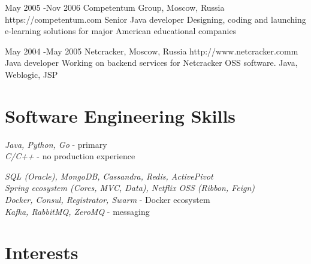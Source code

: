 \documentclass[10pt]{article} %
\begin{document}
        \job
        {May 2005 -}{Nov 2006}
        {Competentum Group, Moscow, Russia}
        {https://competentum.com}
        {Senior Java developer}
        {Designing, coding and launching e-learning solutions for major American educational companies}

        \job
        {May 2004 -}{May 2005}
        {Netcracker, Moscow, Russia}
        {http://www.netcracker.comm}
        {Java developer}
        {Working on backend services for Netcracker OSS software. Java, Weblogic, JSP}


        \section{Software Engineering Skills}

        {
            \textit{Java, Python, Go} - primary \\
            \textit{C/C++} - no production experience\\
        }


        {
            \textit{SQL (Oracle), MongoDB, Cassandra, Redis, ActivePivot}\\
            \textit{Spring ecosystem (Cores, MVC, Data), Netflix OSS (Ribbon, Feign)}\\
            \textit{Docker, Consul, Registrator, Swarm} - Docker ecosystem\\
            \textit{Kafka, RabbitMQ, ZeroMQ} - messaging\\
        }



        \section{Interests}

\end{document}
